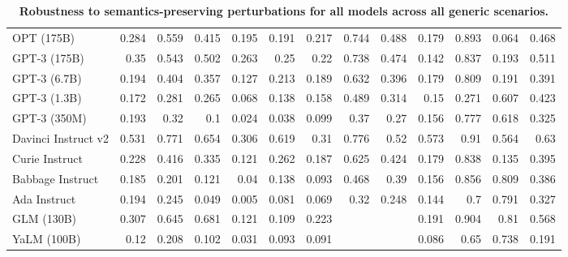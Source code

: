 \begin{table}[htp]
{\begin{tabular}{lrrrrrrrrrrrr}
OPT (175B) & 0.284 & 0.559 & 0.415 & 0.195 & 0.191 & 0.217 & 0.744 & 0.488 & 0.179 & 0.893 & 0.064 & 0.468 \\
GPT-3 (175B) & 0.35 & 0.543 & 0.502 & 0.263 & 0.25 & 0.22 & 0.738 & 0.474 & 0.142 & 0.837 & 0.193 & 0.511 \\
GPT-3 (6.7B) & 0.194 & 0.404 & 0.357 & 0.127 & 0.213 & 0.189 & 0.632 & 0.396 & 0.179 & 0.809 & 0.191 & 0.391 \\
GPT-3 (1.3B) & 0.172 & 0.281 & 0.265 & 0.068 & 0.138 & 0.158 & 0.489 & 0.314 & 0.15 & 0.271 & 0.607 & 0.423 \\
GPT-3 (350M) & 0.193 & 0.32 & 0.1 & 0.024 & 0.038 & 0.099 & 0.37 & 0.27 & 0.156 & 0.777 & 0.618 & 0.325 \\
Davinci Instruct v2 & 0.531 & 0.771 & 0.654 & 0.306 & 0.619 & 0.31 & 0.776 & 0.52 & 0.573 & 0.91 & 0.564 & 0.63 \\
Curie Instruct & 0.228 & 0.416 & 0.335 & 0.121 & 0.262 & 0.187 & 0.625 & 0.424 & 0.179 & 0.838 & 0.135 & 0.395 \\
Babbage Instruct & 0.185 & 0.201 & 0.121 & 0.04 & 0.138 & 0.093 & 0.468 & 0.39 & 0.156 & 0.856 & 0.809 & 0.386 \\
Ada Instruct & 0.194 & 0.245 & 0.049 & 0.005 & 0.081 & 0.069 & 0.32 & 0.248 & 0.144 & 0.7 & 0.791 & 0.327 \\
GLM (130B) & 0.307 & 0.645 & 0.681 & 0.121 & 0.109 & 0.223 &  &  & 0.191 & 0.904 & 0.81 & 0.568 \\
YaLM (100B) & 0.12 & 0.208 & 0.102 & 0.031 & 0.093 & 0.091 &  &  & 0.086 & 0.65 & 0.738 & 0.191 \\
\bottomrule
\end{tabular}}
\caption{\textbf{Robustness to semantics-preserving perturbations for all models across all generic scenarios.}}
\label{tab:robustness-generic}
\end{table}